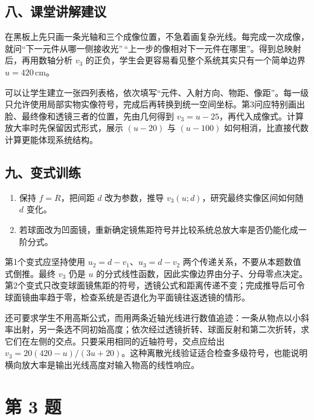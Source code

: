 \documentclass[12pt,a4paper,UTF8]{ctexart}
\newcommand{\tightlist}{\setlength{\itemsep}{0pt}\setlength{\parskip}{0pt}}
\begin{document}
\subsection{八、课堂讲解建议}\label{ux516bux8bfeux5802ux8bb2ux89e3ux5efaux8bae-1}

在黑板上先只画一条光轴和三个成像位置，不急着画复杂光线。每完成一次成像，就问``下一元件从哪一侧接收光''\,``上一步的像相对下一元件在哪里''。得到总映射后，再用数轴分析
\(v_3\) 的正负，学生会更容易看见整个系统其实只有一个简单边界
\(u=420\,\mathrm{cm}\)。

可以让学生建立一张四列表格，依次填写``元件、入射方向、物距、像距''。每一级只允许使用局部实物实像符号，完成后再转换到统一空间坐标。第3问应特别画出脸、最终像和透镜三者的位置，先由几何得到
\(v_3=u-25\)，再代入成像式。计算放大率时先保留因式形式，展示 \((u-20)\)
与 \((u-100)\) 如何相消，比直接代数计算更能体现系统结构。

\subsection{九、变式训练}\label{ux4e5dux53d8ux5f0fux8badux7ec3-1}

\begin{enumerate}
\def\labelenumi{\arabic{enumi}.}
\tightlist
\item
  保持 \(f=R\)，把间距 \(d\) 改为参数，推导
  \(v_3(u;d)\)，研究最终实像区间如何随 \(d\) 变化。
\item
  若球面改为凹面镜，重新确定镜焦距符号并比较系统总放大率是否仍能化成一阶分式。
\end{enumerate}

第1个变式应坚持使用 \(u_2=d-v_1\)、\(u_3=d-v_2\)
两个传递关系，不要从本题数值式倒推。最终 \(v_3\) 仍是 \(u\)
的分式线性函数，因此实像边界由分子、分母零点决定。第2个变式只改变球面镜焦距的符号，透镜公式和距离传递不变；完成推导后可令球面镜曲率趋于零，检查系统是否退化为平面镜往返透镜的情形。

还可要求学生不用高斯公式，而用两条近轴光线进行数值追迹：一条从物点以小斜率出射，另一条选不同初始高度；依次经过透镜折转、球面反射和第二次折转，求它们在左侧的交点。只要采用相同的近轴符号，交点应给出
\(v_3=20(420-u)/(3u+20)\)。这种离散光线验证适合检查多级符号，也能说明横向放大率是输出光线高度对输入物高的线性响应。

\newpage

\section{第 3 题}\label{ux7b2c-3-ux9898}
\end{document}
